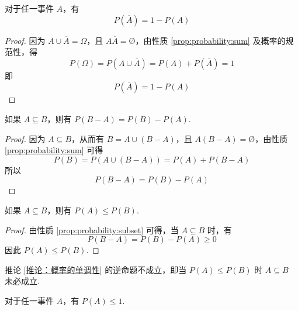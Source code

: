 \begin{property}
    \indent 对于任一事件 $A$，有
    \begin{equation}
        P(\overline{A})=1-P(A)
    \end{equation}
\end{property}

\begin{proof}
    因为 $A \cup \overline{A} = \varOmega$，且 $A \overline{A} = \text{\O}$，由性质 \ref{prop:probability:sum} 及概率的规范性，得
    $$
    P(\varOmega) = P(A \cup \overline{A}) = P(A) + P(\overline{A}) = 1
    $$
    即
    \[
    P(\overline{A})=1-P(A)
    \]

    \vspace{-2em}
\end{proof}

\begin{property}
    \indent 如果 $A \subseteq B$，则有 $P(B-A)=P(B)-P(A)$.
\end{property}

\begin{proof}
    因为 $A \subseteq B$，从而有 $B = A \cup (B-A)$，且 $A(B-A)=\text{\O}$，由性质 \ref{prop:probability:sum} 可得
    $$
    P(B) = P(A \cup (B-A)) = P(A) + P(B-A)
    $$
    所以
    $$
    P(B-A)=P(B)-P(A)
    $$

    \vspace{-2em}
\end{proof}

\begin{corollary}[][概率的单调性][推论：概率的单调性]
    \indent 如果 $A \subseteq B$，则有 $P(A) \leqslant P(B)$.
\end{corollary}

\begin{proof}
    由性质 \ref{prop:probability:subset} 可得，当 $A \subseteq B$ 时，有
    $$
    P(B-A) = P(B)-P(A) \geqslant 0
    $$
    因此 $P(A) \leqslant P(B)$.
\end{proof}

\begin{note}
    \indent 推论 \ref{推论：概率的单调性} 的逆命题不成立，即当 $P(A) \leqslant P(B)$ 时 $A \subseteq B$ 未必成立.
\end{note}

\begin{property}[][][prop:probability:<=1]
    \indent 对于任一事件 $A$，有 $P(A) \leqslant 1$.
\end{property}

